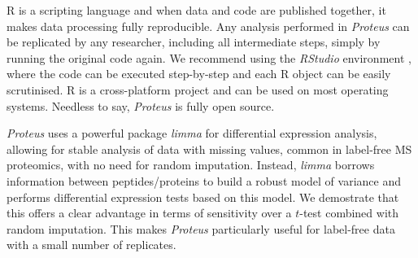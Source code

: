 \documentclass[]{article}
\begin{document}
R is a scripting language and when data and code are published together,
it makes data processing fully reproducible. Any analysis performed in
\emph{Proteus} can be replicated by any researcher, including all
intermediate steps, simply by running the original code again. We
recommend using the \emph{RStudio} environment \citep{rstudio}, where
the code can be executed step-by-step and each R object can be easily
scrutinised. R is a cross-platform project and can be used on most
operating systems. Needless to say, \emph{Proteus} is fully open source.

\emph{Proteus} uses a powerful package \emph{limma} for differential
expression analysis, allowing for stable analysis of data with missing
values, common in label-free MS proteomics, with no need for random
imputation. Instead, \emph{limma} borrows information between
peptides/proteins to build a robust model of variance and performs
differential expression tests based on this model. We demostrate that
this offers a clear advantage in terms of sensitivity over a \(t\)-test
combined with random imputation. This makes \emph{Proteus} particularly
useful for label-free data with a small number of replicates.

\renewcommand\refname{References}

\end{document}
